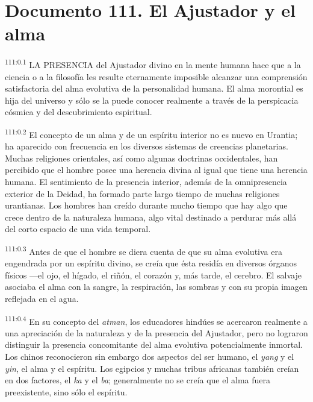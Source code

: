 \chapter{Documento 111. El Ajustador y el alma}
\par
\textsuperscript{111:0.1} LA PRESENCIA del Ajustador divino en la mente humana hace que a la ciencia o a la filosofía les resulte eternamente imposible alcanzar una comprensión satisfactoria del alma evolutiva de la personalidad humana. El alma morontial es hija del universo y sólo se la puede conocer realmente a través de la perspicacia cósmica y del descubrimiento espiritual.

\par
\textsuperscript{111:0.2} El concepto de un alma y de un espíritu interior no es nuevo en Urantia; ha aparecido con frecuencia en los diversos sistemas de creencias planetarias. Muchas religiones orientales, así como algunas doctrinas occidentales, han percibido que el hombre posee una herencia divina al igual que tiene una herencia humana. El sentimiento de la presencia interior, además de la omnipresencia exterior de la Deidad, ha formado parte largo tiempo de muchas religiones urantianas. Los hombres han creído durante mucho tiempo que hay algo que crece dentro de la naturaleza humana, algo vital destinado a perdurar más allá del corto espacio de una vida temporal.

\par
\textsuperscript{111:0.3} Antes de que el hombre se diera cuenta de que su alma evolutiva era engendrada por un espíritu divino, se creía que ésta residía en diversos órganos físicos ---el ojo, el hígado, el riñón, el corazón y, más tarde, el cerebro. El salvaje asociaba el alma con la sangre, la respiración, las sombras y con su propia imagen reflejada en el agua.

\par
\textsuperscript{111:0.4} En su concepto del \textit{atman}, los educadores hindúes se acercaron realmente a una apreciación de la naturaleza y de la presencia del Ajustador, pero no lograron distinguir la presencia concomitante del alma evolutiva potencialmente inmortal. Los chinos reconocieron sin embargo dos aspectos del ser humano, el \textit{yang} y el \textit{yin}, el alma y el espíritu. Los egipcios y muchas tribus africanas también creían en dos factores, el \textit{ka} y el \textit{ba}; generalmente no se creía que el alma fuera preexistente, sino sólo el espíritu.

